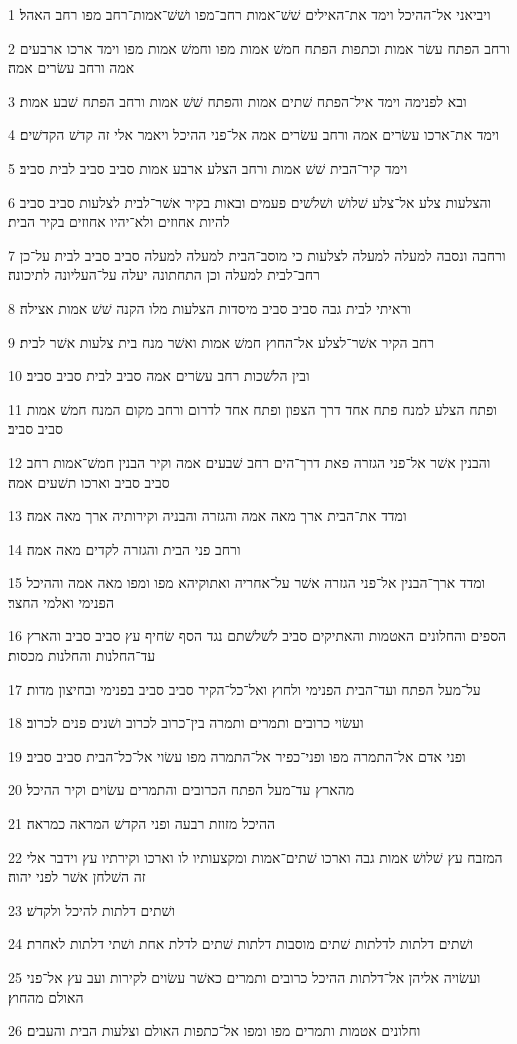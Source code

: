 \par 1 ויביאני אל־ההיכל וימד את־האילים שׁשׁ־אמות רחב־מפו ושׁשׁ־אמות־רחב מפו רחב האהל׃
\par 2 ורחב הפתח עשׂר אמות וכתפות הפתח חמשׁ אמות מפו וחמשׁ אמות מפו וימד ארכו ארבעים אמה ורחב עשׂרים אמה׃
\par 3 ובא לפנימה וימד איל־הפתח שׁתים אמות והפתח שׁשׁ אמות ורחב הפתח שׁבע אמות׃
\par 4 וימד את־ארכו עשׂרים אמה ורחב עשׂרים אמה אל־פני ההיכל ויאמר אלי זה קדשׁ הקדשׁים׃
\par 5 וימד קיר־הבית שׁשׁ אמות ורחב הצלע ארבע אמות סביב סביב לבית סביב׃
\par 6 והצלעות צלע אל־צלע שׁלושׁ ושׁלשׁים פעמים ובאות בקיר אשׁר־לבית לצלעות סביב סביב להיות אחוזים ולא־יהיו אחוזים בקיר הבית׃
\par 7 ורחבה ונסבה למעלה למעלה לצלעות כי מוסב־הבית למעלה למעלה סביב סביב לבית על־כן רחב־לבית למעלה וכן התחתונה יעלה על־העליונה לתיכונה׃
\par 8 וראיתי לבית גבה סביב סביב מיסדות הצלעות מלו הקנה שׁשׁ אמות אצילה׃
\par 9 רחב הקיר אשׁר־לצלע אל־החוץ חמשׁ אמות ואשׁר מנח בית צלעות אשׁר לבית׃
\par 10 ובין הלשׁכות רחב עשׂרים אמה סביב לבית סביב סביב׃
\par 11 ופתח הצלע למנח פתח אחד דרך הצפון ופתח אחד לדרום ורחב מקום המנח חמשׁ אמות סביב סביב׃
\par 12 והבנין אשׁר אל־פני הגזרה פאת דרך־הים רחב שׁבעים אמה וקיר הבנין חמשׁ־אמות רחב סביב סביב וארכו תשׁעים אמה׃
\par 13 ומדד את־הבית ארך מאה אמה והגזרה והבניה וקירותיה ארך מאה אמה׃
\par 14 ורחב פני הבית והגזרה לקדים מאה אמה׃
\par 15 ומדד ארך־הבנין אל־פני הגזרה אשׁר על־אחריה ואתוקיהא מפו ומפו מאה אמה וההיכל הפנימי ואלמי החצר׃
\par 16 הספים והחלונים האטמות והאתיקים סביב לשׁלשׁתם נגד הסף שׂחיף עץ סביב סביב והארץ עד־החלנות והחלנות מכסות׃
\par 17 על־מעל הפתח ועד־הבית הפנימי ולחוץ ואל־כל־הקיר סביב סביב בפנימי ובחיצון מדות׃
\par 18 ועשׂוי כרובים ותמרים ותמרה בין־כרוב לכרוב ושׁנים פנים לכרוב׃
\par 19 ופני אדם אל־התמרה מפו ופני־כפיר אל־התמרה מפו עשׂוי אל־כל־הבית סביב סביב׃
\par 20 מהארץ עד־מעל הפתח הכרובים והתמרים עשׂוים וקיר ההיכל׃
\par 21 ההיכל מזוזת רבעה ופני הקדשׁ המראה כמראה׃
\par 22 המזבח עץ שׁלושׁ אמות גבה וארכו שׁתים־אמות ומקצעותיו לו וארכו וקירתיו עץ וידבר אלי זה השׁלחן אשׁר לפני יהוה׃
\par 23 ושׁתים דלתות להיכל ולקדשׁ׃
\par 24 ושׁתים דלתות לדלתות שׁתים מוסבות דלתות שׁתים לדלת אחת ושׁתי דלתות לאחרת׃
\par 25 ועשׂויה אליהן אל־דלתות ההיכל כרובים ותמרים כאשׁר עשׂוים לקירות ועב עץ אל־פני האולם מהחוץ׃
\par 26 וחלונים אטמות ותמרים מפו ומפו אל־כתפות האולם וצלעות הבית והעבים׃

